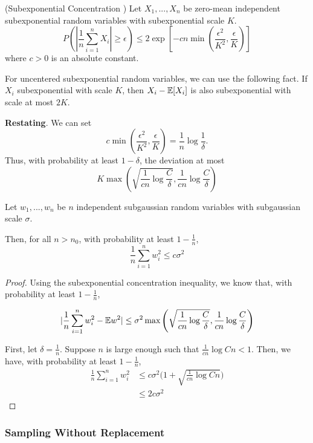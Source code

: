 \begin{proposition} (Subexponential Concentration \cite{vershynin2010introduction})
Let $X_1,...,X_n$ be zero-mean independent subexponential random variables with subexponential scale $K$. 
\[
P( | \frac{1}{n} \sum_{i=1}^n X_i | \geq \epsilon) \leq
	2 \exp \left[ -c n \min\left( \frac{\epsilon^2}{K^2}, \frac{\epsilon}{K} \right) \right]
\]
where $c > 0$ is an absolute constant.
\end{proposition}

For uncentered subexponential random variables, we can use the following fact. If $X_i$ subexponential with scale $K$, then $X_i - {\mathbb E}[X_i]$ is also subexponential with scale at most $2K$.

\textbf{Restating}. We can set
\[
c \min\left( \frac{\epsilon^2}{K^2}, \frac{\epsilon}{K} \right) = \frac{1}{n} \log \frac{1}{\delta}.
\]
Thus, with probability at least $1-\delta$, the deviation at most
\[
K \max\left( \sqrt{\frac{1}{cn} \log \frac{C}{\delta}},  \frac{1}{cn} \log \frac{C}{\delta} \right)
\]


\begin{corollary}
Let $w_1,...,w_n$ be $n$ independent subgaussian random variables with subgaussian scale $\sigma$. 

Then, for all $n > n_0$, with probability at least $1- \frac{1}{n}$,
\[
\frac{1}{n} \sum_{i=1}^n w_i^2 \leq c \sigma^2 
\]
\end{corollary}

\begin{proof}
Using the subexponential concentration inequality, we know that, with probability at least $1-\frac{1}{n}$, 

\[
| \frac{1}{n} \sum_{i=1}^n w_i^2 - {\mathbb E} w^2 | \leq \sigma^2 \max\left( \sqrt{\frac{1}{cn} \log \frac{C}{\delta}}, \frac{1}{cn}\log \frac{C}{\delta} \right)
\]

First, let $\delta = \frac{1}{n}$. Suppose $n$ is large enough such that $ \frac{1}{cn} \log Cn < 1$. Then, we have, with probability at least $1-\frac{1}{n}$,
\begin{align*}
 \frac{1}{n} \sum_{i=1}^n w_i^2 &\leq c\sigma^2 \Big(1+\sqrt{\frac{1}{cn} \log Cn}\Big) \\
		&\leq 2 c \sigma^2
 \end{align*}
 
\end{proof}



\subsubsection{Sampling Without Replacement}

